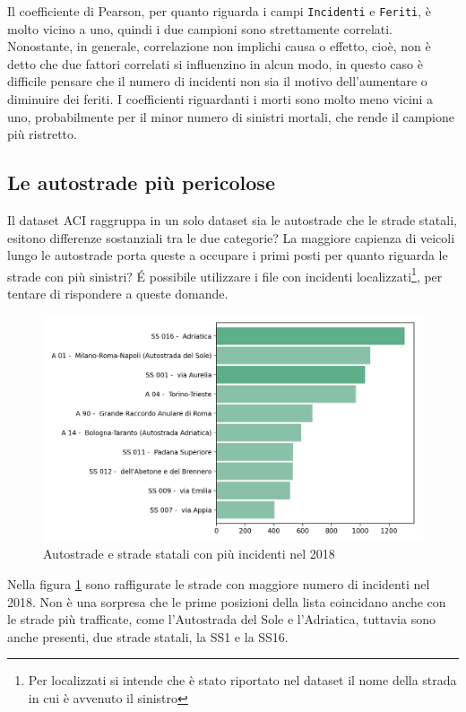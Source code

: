\documentclass[a4paper,12pt]{report}
\newcommand{\columnstyle}[1]{\texttt{#1}}
\begin{document}
Il coefficiente di Pearson, per quanto riguarda i campi \columnstyle{Incidenti} 
e \columnstyle{Feriti}, 
è molto vicino a uno, quindi i due campioni sono strettamente correlati.
Nonostante, in generale, correlazione non implichi causa o effetto, cioè, non 
è detto che due fattori correlati si influenzino in alcun modo, in questo caso è 
difficile pensare che il numero di incidenti non sia il motivo dell'aumentare o diminuire 
dei feriti.
I coefficienti riguardanti i morti sono molto meno vicini a uno, probabilmente 
per il minor numero di sinistri mortali, che rende il campione più ristretto.

\subsection{Le autostrade più pericolose}

Il dataset ACI raggruppa in un solo dataset sia le autostrade che le strade statali, 
esitono differenze sostanziali tra le due categorie?
La maggiore capienza di veicoli lungo le autostrade porta queste a occupare i primi 
posti per quanto riguarda le strade con più sinistri?
\'E possibile utilizzare i file con incidenti 
localizzati\footnote{Per localizzati si intende che è stato riportato nel dataset 
il nome della strada in cui è avvenuto il sinistro}, 
per tentare di rispondere a queste domande.

\begin{figure}
    \includegraphics[width=\linewidth]{../src/incidenti/incidenti_aci/autostrade/autostrade.png}
    \caption{Autostrade e strade statali con più incidenti nel 2018}
    \label{fig:incidenti-autostrade}
\end{figure}

Nella figura \ref{fig:incidenti-autostrade} sono  raffigurate le strade con 
maggiore numero di incidenti nel 2018. 
Non è una sorpresa che le prime posizioni della lista coincidano 
anche con le strade più trafficate, come l'Autostrada del Sole e l'Adriatica, 
tuttavia sono anche presenti, due strade statali, la SS1 e la SS16. 
\end{document}
